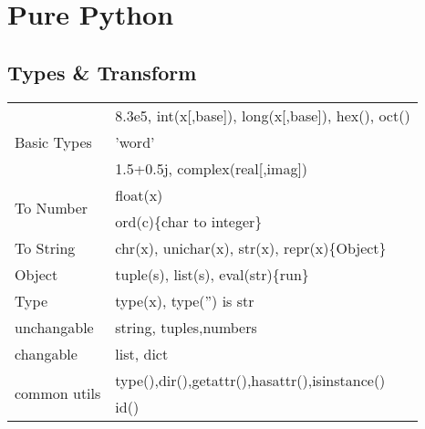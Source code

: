 
\section{Pure Python}
\subsection{Types \& Transform}

\begin{tabular}{@{}l|l@{}}
    \multirow{3}{*}{Basic Types}  & {8.3e5, int(x[,base]), long(x[,base]), hex(), oct()} \\
    {}                            & {'word'} \\
    {}                            & {1.5+0.5j, complex(real[,imag])} \\
    \hline
    \multirow{2}{*}{To Number}    & {float(x)} \\
    {}                            & {ord(c)\{char to integer\}} \\
    \hline
    {To String}                   & {chr(x), unichar(x), str(x), repr(x)\{Object\}} \\
    \hline
    {Object}                      & {tuple(s), list(s), eval(str)\{run\}} \\
    \hline
    {Type}                        & {type(x), type('') is str} \\
    \hline
    {unchangable}                 & {string, tuples,numbers} \\
    {changable}                   & {list, dict} \\
    \hline
    \multirow{2}{*}{common utils} & {type(),dir(),getattr(),hasattr(),isinstance()}\\
    {}                            & {id()}\\
\end{tabular}

